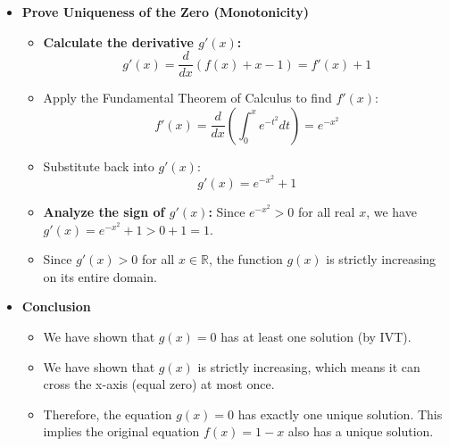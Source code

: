 \begin{cascade}
\begin{itemize}
\begin{itemize}
		      \end{itemize}
		\item \textbf{Prove Uniqueness of the Zero (Monotonicity)}
		      \begin{itemize}
			      \item \textbf{Calculate the derivative $g'(x)$:}
			            \[ g'(x) = \frac{d}{dx} (f(x) + x - 1) = f'(x) + 1 \]
			      \item Apply the Fundamental Theorem of Calculus to find $f'(x)$:
			            \[ f'(x) = \frac{d}{dx} \left( \int_0^x e^{-t^2} dt \right) = e^{-x^2} \]
			      \item Substitute back into $g'(x)$:
			            \[ g'(x) = e^{-x^2} + 1 \]
			      \item \textbf{Analyze the sign of $g'(x)$:} Since $e^{-x^2} > 0$ for all real $x$, we have $g'(x) = e^{-x^2} + 1 > 0 + 1 = 1$.
			      \item Since $g'(x) > 0$ for all $x \in \mathbb{R}$, the function $g(x)$ is strictly increasing on its entire domain.
		      \end{itemize}
		\item \textbf{Conclusion}
		      \begin{itemize}
			      \item We have shown that $g(x)=0$ has at least one solution (by IVT).
			      \item We have shown that $g(x)$ is strictly increasing, which means it can cross the x-axis (equal zero) at most once.
			      \item Therefore, the equation $g(x)=0$ has exactly one unique solution. This implies the original equation $f(x)=1-x$ also has a unique solution.
		      \end{itemize}
	\end{itemize}
\end{cascade}

\hfill

